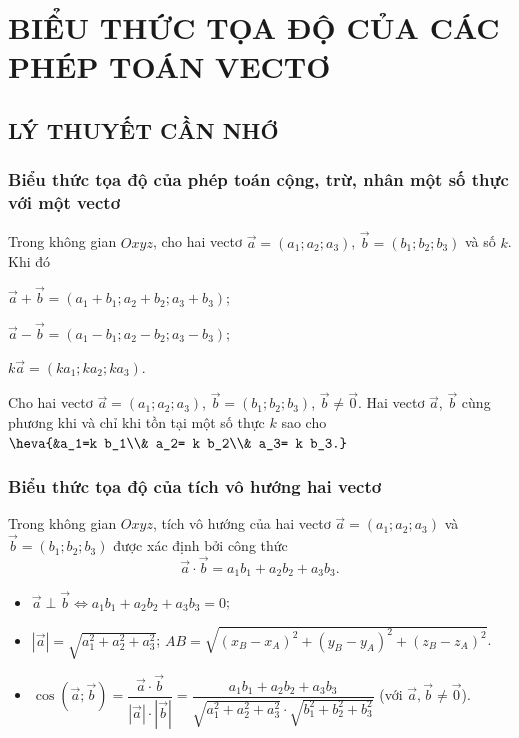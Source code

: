\setcounter{section}{2}
\setcounter{dang}{0}
\newpage
\section{BIỂU THỨC TỌA ĐỘ CỦA CÁC PHÉP TOÁN VECTƠ}
\subsection{LÝ THUYẾT CẦN NHỚ}
\subsubsection{Biểu thức tọa độ của phép toán cộng, trừ, nhân một số thực với một vectơ}
Trong không gian $Oxyz$, cho hai vectơ $\vec{a} = (a_1;a_2;a_3)$, $\vec{b} = (b_1; b_2; b_3)$ và số $k$. Khi đó
\begin{listEX}[1]
	\item [\ding{172}] $\vec{a}+\vec{b}=(a_1+b_1;a_2+b_2;a_3+b_3)$;
	\item [\ding{173}] $\vec{a}-\vec{b}=(a_1-b_1;a_2-b_2;a_3-b_3)$;
	\item [\ding{174}] $k\vec{a} = (ka_1; ka_2; ka_3)$.
\end{listEX}
\begin{note}
	Cho hai vectơ $\vec{a}=(a_1;a_2;a_3)$, $\vec{b}=(b_1;b_2;b_3)$, $\vec{b}\ne \vec{0}$. Hai vectơ $\vec{a}$, $\vec{b}$ cùng phương khi và chỉ khi tồn tại một số thực $k$ sao cho $\heva{&a_1=k b_1\\& a_2= k b_2\\& a_3= k b_3.}$
\end{note}
\subsubsection{Biểu thức tọa độ của tích vô hướng hai vectơ}
Trong không gian $Oxyz$, tích vô hướng của hai vectơ $\vec{a} = (a_1;a_2;a_3)$ và $\vec{b} = (b_1; b_2; b_3)$ được xác định bởi công thức
\[\vec{a} \cdot \vec{b} = a_1b_1 + a_2b_2 + a_3b_3. \]
\begin{note}
	\begin{itemize}
		\item[\ding{172}] $\vec{a} \perp \vec{b} \Leftrightarrow a_1b_1 + a_2b_2 + a_3b_3 = 0$;
		\item[\ding{173}] $\left| \vec{a} \right| = \sqrt{a_1^2 + a_2^2 +a_3^2}$; \quad $AB=\sqrt{(x_B-x_A)^2+(y_B-y_A)^2+(z_B-z_A)^2}$.
		\item[\ding{174}] $\cos \left(\vec{a}; \vec{b}\right) = \dfrac{\vec{a}\cdot \vec{b}}{\left|\vec{a}\right| \cdot \left|\vec{b}\right|} = \dfrac{a_1b_1 + a_2b_2 + a_3b_3}{\sqrt{a_1^2 + a_2^2 +a_3^2} \cdot \sqrt{b_1^2 + b_2^2 +b_3^2}}$ (với $\vec{a},\vec{b} \ne \vec{0}$).
	\end{itemize}
\end{note}


